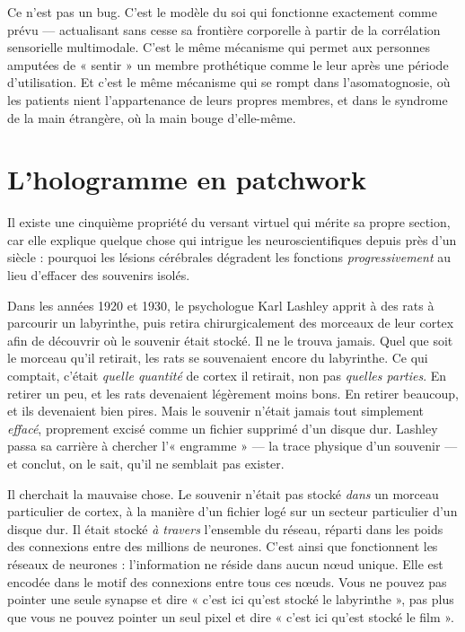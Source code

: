 \documentclass[11pt, twoside, openright]{book}
\begin{document}
Ce n'est pas un bug. C'est le modèle du soi qui fonctionne exactement comme prévu --- actualisant sans cesse sa frontière corporelle à partir de la corrélation sensorielle multimodale. C'est le même mécanisme qui permet aux personnes amputées de « sentir » un membre prothétique comme le leur après une période d'utilisation. Et c'est le même mécanisme qui se rompt dans l'asomatognosie, où les patients nient l'appartenance de leurs propres membres, et dans le syndrome de la main étrangère, où la main bouge d'elle-même.

\section*{L'hologramme en patchwork}

Il existe une cinquième propriété du versant virtuel qui mérite sa propre section, car elle explique quelque chose qui intrigue les neuroscientifiques depuis près d'un siècle : pourquoi les lésions cérébrales dégradent les fonctions \textit{progressivement} au lieu d'effacer des souvenirs isolés.

Dans les années 1920 et 1930, le psychologue Karl Lashley apprit à des rats à parcourir un labyrinthe, puis retira chirurgicalement des morceaux de leur cortex afin de découvrir où le souvenir était stocké. Il ne le trouva jamais. Quel que soit le morceau qu'il retirait, les rats se souvenaient encore du labyrinthe. Ce qui comptait, c'était \textit{quelle quantité} de cortex il retirait, non pas \textit{quelles parties}. En retirer un peu, et les rats devenaient légèrement moins bons. En retirer beaucoup, et ils devenaient bien pires. Mais le souvenir n'était jamais tout simplement \textit{effacé}, proprement excisé comme un fichier supprimé d'un disque dur. Lashley passa sa carrière à chercher l'« engramme » --- la trace physique d'un souvenir --- et conclut, on le sait, qu'il ne semblait pas exister.

Il cherchait la mauvaise chose. Le souvenir n'était pas stocké \textit{dans} un morceau particulier de cortex, à la manière d'un fichier logé sur un secteur particulier d'un disque dur. Il était stocké \textit{à travers} l'ensemble du réseau, réparti dans les poids des connexions entre des millions de neurones. C'est ainsi que fonctionnent les réseaux de neurones : l'information ne réside dans aucun nœud unique. Elle est encodée dans le motif des connexions entre tous ces nœuds. Vous ne pouvez pas pointer une seule synapse et dire « c'est ici qu'est stocké le labyrinthe », pas plus que vous ne pouvez pointer un seul pixel et dire « c'est ici qu'est stocké le film ».
\end{document}
